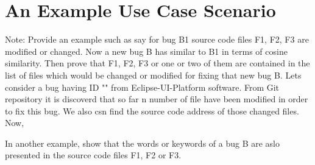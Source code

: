 \documentclass{sig-alternate}
\begin{document}


\section{An Example Use Case Scenario}\label{sec:usecase}
Note:
Provide an example such as say for bug B1 source code files F1, F2, F3 are modified or changed. Now a new bug B has similar to B1 in terms of cosine similarity. Then prove that F1, F2, F3 or one or two of them are contained in the list of files which would be changed or modified for fixing that new bug B.
Lets consider a bug having ID "" from Eclipse-UI-Platform software. From Git repository it is discoverd that so far n number of file have been modified in order to fix this bug. We also csn find the source code address of those changed files. Now, 

In another example, show that the words or keywords of a bug B are aslo presented in the source code files F1, F2 or F3. 
\end{document}
